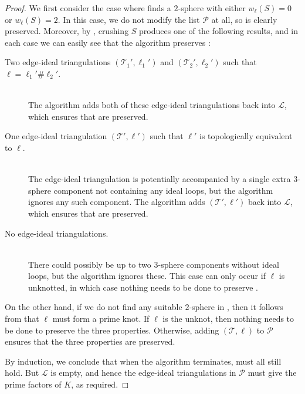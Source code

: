 \documentclass[a4paper,UKenglish,cleveref, autoref, thm-restate]{lipics-v2021}
\newcommand{\tri}{\mathcal{T}}
\begin{document}
\begin{proof}
We first consider the case where  finds a $2$-sphere with either $w_\ell(S) = 0$ or $w_\ell(S) = 2$.
In this case, we do not modify the list $\mathcal{P}$ at all, so  is clearly preserved.
Moreover, by , crushing $S$ produces one of the following results,
and in each case we can easily see that the algorithm preserves :
\begin{description}
\item[Two edge-ideal triangulations $(\tri_1',\ell_1')$ and $(\tri_2',\ell_2')$ such that $\ell=\ell_1'\#\ell_2'$.]
\hfill\\
The algorithm adds both of these edge-ideal triangulations back into $\mathcal{L}$, which ensures that  are preserved.
\item[One edge-ideal triangulation $(\tri',\ell')$ such that $\ell'$ is topologically equivalent to $\ell$.]
\hfill\\
The edge-ideal triangulation is potentially accompanied by a single extra $3$-sphere component not containing any ideal loops, but the algorithm ignores any such component.
The algorithm adds $(\tri',\ell')$ back into $\mathcal{L}$, which ensures that  are preserved.
\item[No edge-ideal triangulations.]
\hfill\\
There could possibly be up to two $3$-sphere components without ideal loops, but the algorithm ignores these.
This case can only occur if $\ell$ is unknotted, in which case nothing needs to be done to preserve .
\end{description}

On the other hand, if we do not find any suitable $2$-sphere in , then it follows from  that $\ell$ must form a prime knot.
If $\ell$ is the unknot, then nothing needs to be done to preserve the three properties.
Otherwise, adding $(\tri,\ell)$ to $\mathcal{P}$ ensures that the three properties are preserved.

By induction, we conclude that when the algorithm terminates,  must all still hold.
But $\mathcal{L}$ is empty, and hence the edge-ideal triangulations in $\mathcal{P}$ must give the prime factors of $K$, as required.
\end{proof}
\end{document}
